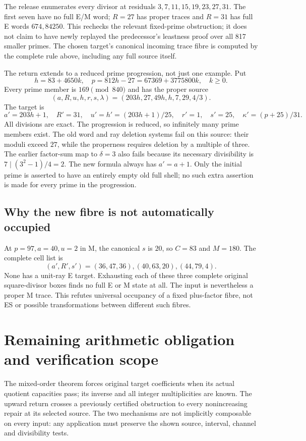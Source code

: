 The release enumerates every divisor at residuals $3,7,11,15,19,23,27,31$.
The first seven have no full E/M word; $R=27$ has proper traces and $R=31$
has full E words $674,84250$. This rechecks the relevant fixed-prime obstruction;
it does not claim to have newly replayed the predecessor's leastness proof over
all 817 smaller primes. The chosen target's canonical incoming trace fibre is
computed by the complete rule above, including any full source itself.

The return extends to a reduced prime progression, not just one example. Put
\[
 h=83+4650k,\quad p=812h-27=67369+3775800k,\quad k\ge0.
\]
Every prime member is $169\pmod{840}$ and has the proper source
\[
 (a,R,u,h,r,s,\lambda)=(203h,27,49h,h,7,29,4/3).
\]
The target is
\[
 a'=203h+1,\quad R'=31,\quad u'=h'=(203h+1)/25,
 \quad r'=1,\quad s'=25,\quad\kappa'=(p+25)/31.
\]
All divisions are exact. The progression is reduced, so infinitely many
prime members exist. The old word and ray deletion systems fail on this
source: their moduli exceed $27$, while the properness requires deletion by
a multiple of three. The earlier factor-sum map to $\delta=3$ also fails
because its necessary divisibility is $7\mid(3^2-1)/4=2$.
The new formula always has $a'=a+1$. Only the initial prime is asserted to
have an entirely empty old full shell; no such extra assertion is made for
every prime in the progression.

\subsection{Why the new fibre is not automatically occupied}
At $p=97,a=40,u=2$ in M, the canonical $s$ is $20$, so $C=83$ and $M=180$.
The complete cell list is
\[
 (a',R',s')=(36,47,36),(40,63,20),(44,79,4).
\]
None has a unit-ray E target. Exhausting each of these three complete original
square-divisor boxes finds no full E or M state at all. The input is nevertheless
a proper M trace. This refutes universal occupancy of a fixed plus-factor fibre,
not ES or possible transformations between different such fibres.

\section{Remaining arithmetic obligation and verification scope}
The mixed-order theorem forces original target coefficients when its actual
quotient capacities pass; its inverse and all integer multiplicities are known.
The upward return crosses a previously certified obstruction to every
nonincreasing repair at its selected source. The two mechanisms are not
implicitly composable on every input: any application must preserve the shown
source, interval, channel and divisibility tests.

